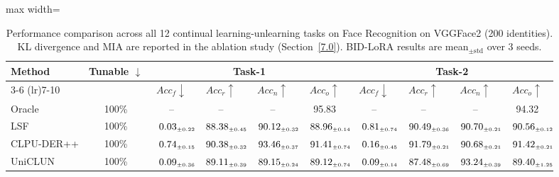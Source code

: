 \begin{table}[!htbp]
\centering
\footnotesize
\renewcommand{\arraystretch}{0.70}
\caption{Performance comparison across all 12 continual learning-unlearning tasks on Face Recognition on VGGFace2 (200 identities). KL divergence and MIA are reported in the ablation study (Section~\ref{7.0}). BID-LoRA results are mean$_{\pm\text{std}}$ over 3 seeds.}
\label{tab:face_recognition}
\begin{adjustbox}{max width=\textwidth}
\setlength{\tabcolsep}{5pt}
\begin{tabular}{l|c|cccc|cccc}
\toprule
\multirow{2}{*}{\textbf{Method}} & \multirow{2}{*}{\textbf{Tunable} $\downarrow$}
& \multicolumn{4}{c|}{\textbf{Task-1}} & \multicolumn{4}{c}{\textbf{Task-2}} \\
\cmidrule(lr){3-6} \cmidrule(lr){7-10}
& & $Acc_f \downarrow$ & $Acc_r \uparrow$ & $Acc_n \uparrow$ & $Acc_o \uparrow$
& $Acc_f \downarrow$ & $Acc_r \uparrow$ & $Acc_n \uparrow$ & $Acc_o \uparrow$ \\
\midrule
Oracle        & 100\% & -- & -- & -- & 95.83 & -- & -- & -- & 94.32 \\
\midrule
LSF & 100\% & $\kern6pt0.03_{\scriptscriptstyle \pm 0.22}\kern-6pt$ & $\kern6pt88.38_{\scriptscriptstyle \pm 0.45}\kern-6pt$ & $\kern6pt90.12_{\scriptscriptstyle \pm 0.32}\kern-6pt$ & $\kern6pt88.96_{\scriptscriptstyle \pm 0.14}\kern-6pt$ & $\kern6pt0.81_{\scriptscriptstyle \pm 0.74}\kern-6pt$ & $\kern6pt90.49_{\scriptscriptstyle \pm 0.36}\kern-6pt$ & $\kern6pt90.70_{\scriptscriptstyle \pm 0.21}\kern-6pt$ & $\kern6pt90.56_{\scriptscriptstyle \pm 0.12}\kern-6pt$ \\
CLPU-DER++ & 100\% & $\kern6pt0.74_{\scriptscriptstyle \pm 0.15}\kern-6pt$ & \colorbox{green!25}{$\kern6pt90.38_{\scriptscriptstyle \pm 0.32}\kern-6pt$} & \colorbox{yellow!35}{$\kern6pt93.46_{\scriptscriptstyle \pm 0.37}\kern-6pt$} & \colorbox{green!25}{$\kern6pt91.41_{\scriptscriptstyle \pm 0.74}\kern-6pt$} & $\kern6pt0.16_{\scriptscriptstyle \pm 0.45}\kern-6pt$ & \colorbox{yellow!35}{$\kern6pt91.79_{\scriptscriptstyle \pm 0.21}\kern-6pt$} & $\kern6pt90.68_{\scriptscriptstyle \pm 0.21}\kern-6pt$ & $\kern6pt91.42_{\scriptscriptstyle \pm 0.21}\kern-6pt$ \\
UniCLUN & 100\% & $\kern6pt0.09_{\scriptscriptstyle \pm 0.36}\kern-6pt$ & $\kern6pt89.11_{\scriptscriptstyle \pm 0.39}\kern-6pt$ & $\kern6pt89.15_{\scriptscriptstyle \pm 0.24}\kern-6pt$ & $\kern6pt89.12_{\scriptscriptstyle \pm 0.74}\kern-6pt$ & $\kern6pt0.09_{\scriptscriptstyle \pm 0.14}\kern-6pt$ & $\kern6pt87.48_{\scriptscriptstyle \pm 0.69}\kern-6pt$ & \colorbox{green!25}{$\kern6pt93.24_{\scriptscriptstyle \pm 0.39}\kern-6pt$} & $\kern6pt89.40_{\scriptscriptstyle \pm 1.25}\kern-6pt$ \\

\end{tabular}
\end{adjustbox}
\end{table}
